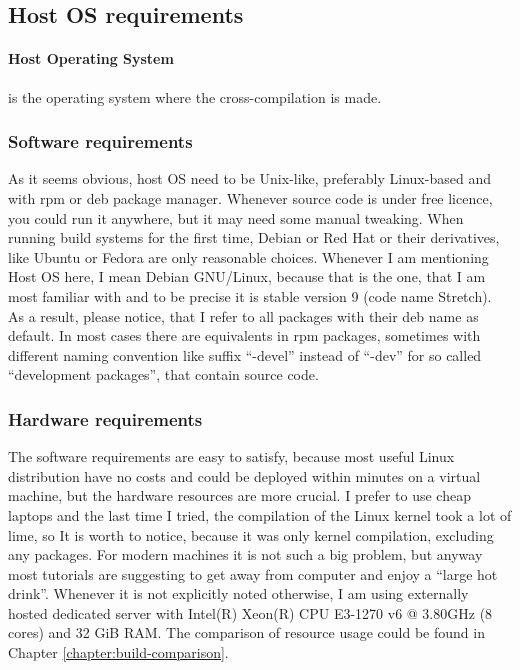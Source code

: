 \documentclass[printmode]{mgr}
\begin{document}
\subsection*{Host OS requirements}

\paragraph{Host Operating System} is the operating system where the cross-compilation is made.

\subsubsection{Software requirements}
As it seems obvious, host OS need to be Unix-like, preferably Linux-based and with rpm or deb package manager. Whenever source code is under free licence, you could run it anywhere, but it may need some manual tweaking. When running build systems for the first time, Debian or Red Hat or their derivatives, like Ubuntu or Fedora are only reasonable choices. Whenever I am mentioning Host OS here, I mean Debian GNU/Linux, because that is the one, that I am most familiar with and to be precise it is stable version 9 (code name Stretch). As a result, please notice, that I refer to all packages with their deb name as default. In most cases there are equivalents in rpm packages, sometimes with different naming convention like suffix ``-devel'' instead of ``-dev'' for so called ``development packages'', that contain source code.

\subsubsection{Hardware requirements}
The software requirements are easy to satisfy, because most useful Linux distribution have no costs and could be deployed within minutes on a virtual machine, but the hardware resources are more crucial. I prefer to use cheap laptops and the last time I tried, the compilation of the Linux kernel took a lot of lime, so It is worth to notice, because it was only kernel compilation, excluding any packages. For modern machines it is not such a big problem, but anyway most tutorials are suggesting to get away from computer and enjoy a ``large hot drink''. Whenever it is not explicitly noted otherwise, I am using externally hosted dedicated server with Intel(R) Xeon(R) CPU E3-1270 v6 @ 3.80GHz (8 cores) and 32 GiB RAM. The comparison of resource usage could be found in Chapter \ref{chapter:build-comparison}.
\end{document}
